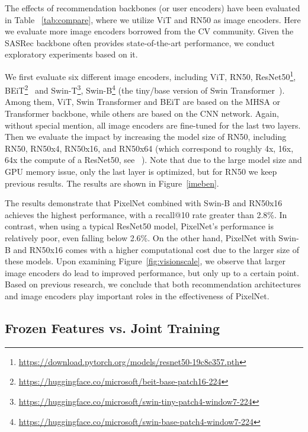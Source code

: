 \documentclass[sigconf]{acmart}
\begin{document}
The effects of recommendation backbones (or user encoders) have been evaluated in Table ~\ref{tab:compare}, where we utilize  ViT and RN50 as image encoders.
Here we evaluate more image encoders  borrowed from the CV community. Given
the SASRec  backbone often provides state-of-the-art performance, we conduct exploratory experiments based on it.


We first evaluate six different image encoders, including ViT, RN50, ResNet50\footnote{\url{https://download.pytorch.org/models/resnet50-19c8e357.pth}}, BEiT\footnote{\url{https://huggingface.co/microsoft/beit-base-patch16-224}}~\cite{DBLP:conf/iclr/Bao0PW22} and Swin-T\footnote{\url{https://huggingface.co/microsoft/swin-tiny-patch4-window7-224}}, Swin-B\footnote{\url{https://huggingface.co/microsoft/swin-base-patch4-window7-224}} (the tiny/base version of Swin Transformer~\cite{liu2021swin}). Among them, ViT, Swin Transformer and BEiT are based on the MHSA or Transformer backbone, while others are based on the CNN network. 
Again, without special mention, all image encoders are fine-tuned for the last two layers. Then we evaluate the impact   by increasing the model size of RN50, including RN50, RN50x4, RN50x16, and RN50x64 (which correspond to roughly 4x, 16x, 64x the compute of a ResNet50, see ~\cite{radford2021learning}). Note that due to the large model size and GPU memory issue, only the last layer is optimized, 
but for RN50 we keep previous results. 
The results are shown in Figure~\ref{imeben}.

The results demonstrate that PixelNet combined with Swin-B and RN50x16 achieves the highest performance, with a recall@10 rate greater than 2.8\%. In contrast, when using a typical ResNet50 model, PixelNet's performance is relatively poor, even falling below 2.6\%.
On the other hand, PixelNet with Swin-B and RN50x16 comes with a higher computational cost due to the larger size of these models. Upon examining Figure~\ref{fig:visionscale}, we observe that larger image encoders do lead to improved performance, but only up to a certain point. Based on previous research, we conclude that both recommendation architectures  and image encoders play important roles in the effectiveness of PixelNet.


\subsection{Frozen Features vs. Joint Training}
\label{E2EEvaluation}
 
\end{document}
